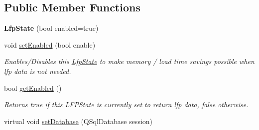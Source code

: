 \subsection*{Public Member Functions}
\begin{DoxyCompactItemize}
\item 
\hypertarget{class_picto_1_1_lfp_state_acc4649b90ed6b75509bbf0cc82dcd701}{{\bfseries Lfp\-State} (bool enabled=true)}\label{class_picto_1_1_lfp_state_acc4649b90ed6b75509bbf0cc82dcd701}

\item 
void \hyperlink{class_picto_1_1_lfp_state_a2f6a5af85e42ac0cddc7bd1e91542dab}{set\-Enabled} (bool enable)
\begin{DoxyCompactList}\small\item\em Enables/\-Disables this \hyperlink{class_picto_1_1_lfp_state}{Lfp\-State} to make memory / load time savings possible when lfp data is not needed. \end{DoxyCompactList}\item 
bool \hyperlink{class_picto_1_1_lfp_state_abaf0ee9c27ad1ffc9c2688fa9f173954}{get\-Enabled} ()
\begin{DoxyCompactList}\small\item\em Returns true if this L\-F\-P\-State is currently set to return lfp data, false otherwise. \end{DoxyCompactList}\item 
\hypertarget{class_picto_1_1_lfp_state_a2bd129131178dfbd4c6868c44b0d3de4}{virtual void \hyperlink{class_picto_1_1_lfp_state_a2bd129131178dfbd4c6868c44b0d3de4}{set\-Database} (Q\-Sql\-Database session)}\label{class_picto_1_1_lfp_state_a2bd129131178dfbd4c6868c44b0d3de4}


\end{DoxyCompactItemize}
